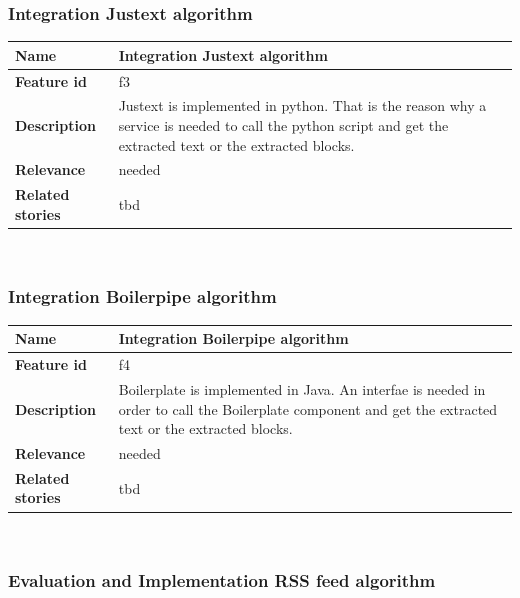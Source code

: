 \subsubsection{Integration Justext algorithm}
\label{subsec:Integration Justext algorithm}

	\begin{tabular}{ | p{3cm} | p{12cm} |}
	\hline
	\textbf{Name} 				& Integration Justext algorithm \\ \hline
	\textbf{Feature id} 		& f3 \\ \hline
	\textbf{Description} 		& Justext is implemented in python. That is the reason why a service is needed to call the python script and get the extracted text or the extracted blocks.\\ \hline
	\textbf{Relevance} 			& needed \\ \hline
	\textbf{Related stories} 	& tbd \\ \hline
	\end{tabular} \\

\subsubsection{Integration Boilerpipe algorithm}
\label{subsec:Integration Boilerpipe algorithm}

	\begin{tabular}{ | p{3cm} | p{12cm} |}
	\hline
	\textbf{Name} 				& Integration Boilerpipe algorithm \\ \hline
	\textbf{Feature id} 		& f4 \\ \hline
	\textbf{Description} 		& Boilerplate is implemented in Java. An interfae is needed in order to call the Boilerplate component and get the extracted text or the extracted blocks.\\ \hline
	\textbf{Relevance} 			& needed \\ \hline
	\textbf{Related stories} 	& tbd \\ \hline
	\end{tabular} \\

\subsubsection{Evaluation and Implementation RSS feed algorithm}
\label{subsec:Evaluation and Implementation RSS feed algorithm}

